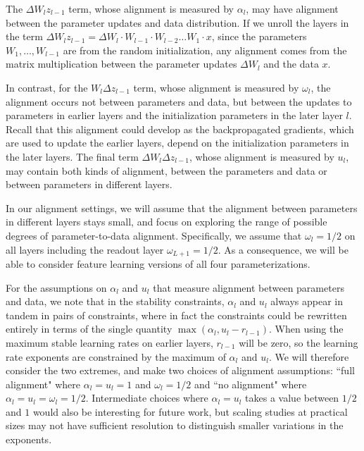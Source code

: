 \documentclass{article}
\theoremstyle{plain}
\theoremstyle{definition}
\theoremstyle{remark}
\begin{document}
The $\Delta W_{l} z_{l-1}$ term, whose alignment is measured by $\alpha_l$, may have alignment between the parameter updates and data distribution. If we unroll the layers in the term $\Delta W_l  z_{l-1} = \Delta W_l \cdot W_{l-1} \cdot W_{l-2} \ldots W_1 \cdot x$, since the parameters $W_1, \ldots, W_{l-1}$ are from the random initialization, any alignment comes from the matrix multiplication between the parameter updates $\Delta W_{l}$ and the data $x$.

In contrast, for the $W_{l} \Delta z_{l-1}$ term, whose alignment is measured by $\omega_l$, the alignment occurs not between parameters and data, but between the updates to parameters in earlier layers and the initialization parameters in the later layer $l$. Recall that this alignment could develop as the backpropagated gradients, which are used to update the earlier layers, depend on the initialization parameters in the later layers. The final term $\Delta W_{l} \Delta z_{l-1}$, whose alignment is measured by $u_l$, may contain both kinds of alignment, between the parameters and data or between parameters in different layers.


In our alignment settings, we will assume that the alignment between parameters in different layers stays small, and focus on exploring the range of possible degrees of parameter-to-data alignment. Specifically, we assume that $\omega_l = 1/2$ on all layers including the readout layer $\omega_{L+1} = 1/2$. As a consequence, we will be able to consider feature learning versions of all four parameterizations.

For the assumptions on $\alpha_l$ and $u_l$ that measure alignment between parameters and data, we note that in the stability constraints, $\alpha_l$ and $u_l$ always appear in tandem in pairs of constraints, where in fact the constraints could be rewritten entirely in terms of the single quantity $\max(\alpha_l, u_l - r_{l-1})$. When using the maximum stable learning rates on earlier layers, $r_{l-1}$ will be zero, so the learning rate exponents are constrained by the maximum of $\alpha_l$ and $u_l$. We will therefore consider the two extremes, and make two choices of alignment assumptions: ``full alignment" where $\alpha_l = u_l = 1$ and $\omega_l = 1/2$ and ``no alignment" where $\alpha_l = u_l = \omega_l = 1/2$. Intermediate choices where $\alpha_l = u_l$ takes a value between $1/2$ and $1$ would also be interesting for future work, but scaling studies at practical sizes may not have sufficient resolution to distinguish smaller variations in the exponents.
\end{document}
